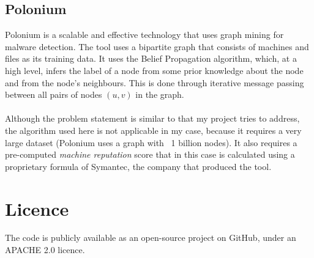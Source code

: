 \documentclass[12pt,a4paper,twoside,openright]{report}
\begin{document}
\subsection{Polonium}
Polonium is a scalable and effective technology that uses graph mining for malware detection. The tool uses a bipartite graph that consists of machines and files as its training data. It uses the Belief Propagation algorithm, which, at a high level, infers the label of a node from some prior knowledge about the node and from the node's neighbours. This is done through iterative message passing between all pairs of nodes $(u, v)$ in the graph. 
\\ \\
Although the problem statement is similar to that my project tries to address, the algorithm used here is not applicable in my case, because it requires a very large dataset (Polonium uses a graph with ~1 billion nodes). It also requires a pre-computed \textit{machine reputation} score that in this case is calculated using a proprietary formula of Symantec\footnotemark[2], the company that produced the tool. 


\section{Licence} 
The code is publicly available as an open-source project on GitHub\footnotemark[3], under an APACHE 2.0 licence\footnotemark[4]. 


\end{document}
